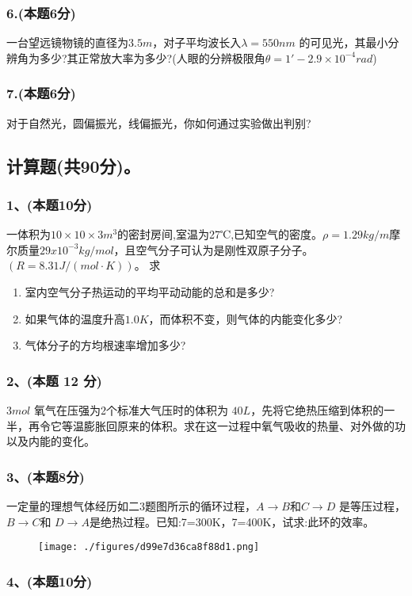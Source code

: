 \subsubsection{6.(本题6分)}
一台望远镜物镜的直径为$3.5m$，对子平均波长入$\lambda=550nm$ 的可见光，其最小分辨角为多少?其正常放大率为多少?(人眼的分辨极限角$\theta=1'-2.9\times10^{-4}rad$)
\subsubsection{7.(本题6分)}
对于自然光，圆偏振光，线偏振光，你如何通过实验做出判别?
\subsection{计算题(共90分)。}
\subsubsection{1、(本题10分)}
一体积为$10\times10\times3m^3$的密封房间,室温为27℃,已知空气的密度。$\rho=1.29kg/m$摩尔质量$29x10^{-3}kg/mol$，且空气分子可认为是刚性双原子分子。$(R=8.31J/(mol\cdot K))$。
求
\begin{enumerate}
\item 室内空气分子热运动的平均平动动能的总和是多少?
\item 如果气体的温度升高$1.0K$，而体积不变，则气体的内能变化多少?
\item 气体分子的方均根速率增加多少?
\end{enumerate}
\subsubsection{2、(本题 12 分)}
$3mol$ 氧气在压强为2个标准大气压时的体积为 $40L$，先将它绝热压缩到体积的一半，再令它等温膨胀回原来的体积。求在这一过程中氧气吸收的热量、对外做的功以及内能的变化。
\subsubsection{3、(本题8分)}
一定量的理想气体经历如二3题图所示的循环过程，$A\to B$和$C\to D$ 是等压过程，$B\to C$和 $D\to A$是绝热过程。已知:7=300K，7=400K，试求:此环的效率。
\begin{figure}[ht]
\centering
\texttt{[image: ./figures/d99e7d36ca8f88d1.png]}
\caption{} \label{fig_CD13_3}
\end{figure}
\subsubsection{4、(本题10分)}

